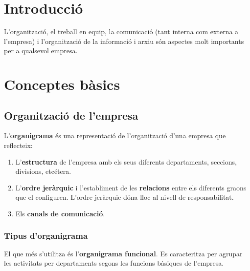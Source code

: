 \documentclass[
  openany]{book}
\author{Fernando Verdú Primo}
\date{2022-01-04}
\begin{document}

\newpage

{
\setcounter{tocdepth}{1}
\tableofcontents
}
\hypertarget{introducciuxf3}{%
\chapter{Introducció}\label{introducciuxf3}}

L'organització, el treball en equip, la comunicació (tant interna com externa a l'empresa) i l'organització de la informació i arxiu són aspectes molt importants per a qualsevol empresa.

\hypertarget{conceptes-buxe0sics}{%
\chapter{Conceptes bàsics}\label{conceptes-buxe0sics}}

\hypertarget{organitzaciuxf3-de-lempresa}{%
\section{Organització de l'empresa}\label{organitzaciuxf3-de-lempresa}}

L'\textbf{organigrama} és una representació de l'organització d'una empresa que reflecteix:

\begin{enumerate}
\def\labelenumi{\alph{enumi}.}
\item
  L'\textbf{estructura} de l'empresa amb els seus diferents departaments, seccions, divisions, etcétera.
\item
  L'\textbf{ordre jeràrquic} i l'establiment de les \textbf{relacions} entre els diferents graons que el configuren. L'ordre jeràrquic dóna lloc al nivell de responsabilitat.
\item
  Els \textbf{canals de comunicació}.
\end{enumerate}

\hypertarget{tipus-dorganigrama}{%
\subsection{Tipus d'organigrama}\label{tipus-dorganigrama}}

El que més s'utilitza és l'\textbf{organigrama funcional}. Es caracteritza per agrupar les activitats per departaments segons les funcions bàsiques de l'empresa.
\end{document}
